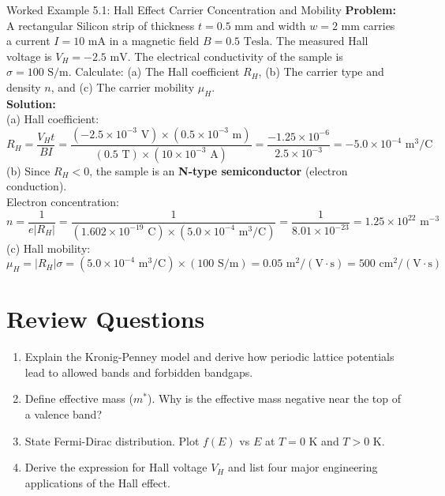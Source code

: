 \begin{examplebox}{Worked Example 5.1: Hall Effect Carrier Concentration and Mobility}
\textbf{Problem:} A rectangular Silicon strip of thickness $t = 0.5\text{ mm}$ and width $w = 2\text{ mm}$ carries a current $I = 10\text{ mA}$ in a magnetic field $B = 0.5\text{ Tesla}$. The measured Hall voltage is $V_H = -2.5\text{ mV}$. The electrical conductivity of the sample is $\sigma = 100\text{ S/m}$. Calculate: (a) The Hall coefficient $R_H$, (b) The carrier type and density $n$, and (c) The carrier mobility $\mu_H$.\\
\textbf{Solution:}\\
(a) Hall coefficient:
\[
R_H = \frac{V_H t}{B I} = \frac{(-2.5 \times 10^{-3}\text{ V}) \times (0.5 \times 10^{-3}\text{ m})}{(0.5\text{ T}) \times (10 \times 10^{-3}\text{ A})} = \frac{-1.25 \times 10^{-6}}{2.5 \times 10^{-3}} = -5.0 \times 10^{-4}\text{ m}^3/\text{C}
\]
(b) Since $R_H < 0$, the sample is an \textbf{N-type semiconductor} (electron conduction).\\
Electron concentration:
\[
n = \frac{1}{e |R_H|} = \frac{1}{(1.602 \times 10^{-19}\text{ C}) \times (5.0 \times 10^{-4}\text{ m}^3/\text{C})} = \frac{1}{8.01 \times 10^{-23}} = 1.25 \times 10^{22}\text{ m}^{-3}
\]
(c) Hall mobility:
\[
\mu_H = |R_H| \sigma = (5.0 \times 10^{-4}\text{ m}^3/\text{C}) \times (100\text{ S/m}) = 0.05\text{ m}^2/(\text{V}\cdot\text{s}) = 500\text{ cm}^2/(\text{V}\cdot\text{s})
\]
\end{examplebox}

\section{Review Questions}
\begin{enumerate}[leftmargin=*,itemsep=3pt]
    \item Explain the Kronig-Penney model and derive how periodic lattice potentials lead to allowed bands and forbidden bandgaps.
    \item Define effective mass ($m^*$). Why is the effective mass negative near the top of a valence band?
    \item State Fermi-Dirac distribution. Plot $f(E)$ vs $E$ at $T = 0\text{ K}$ and $T > 0\text{ K}$.
    \item Derive the expression for Hall voltage $V_H$ and list four major engineering applications of the Hall effect.
\end{enumerate}
